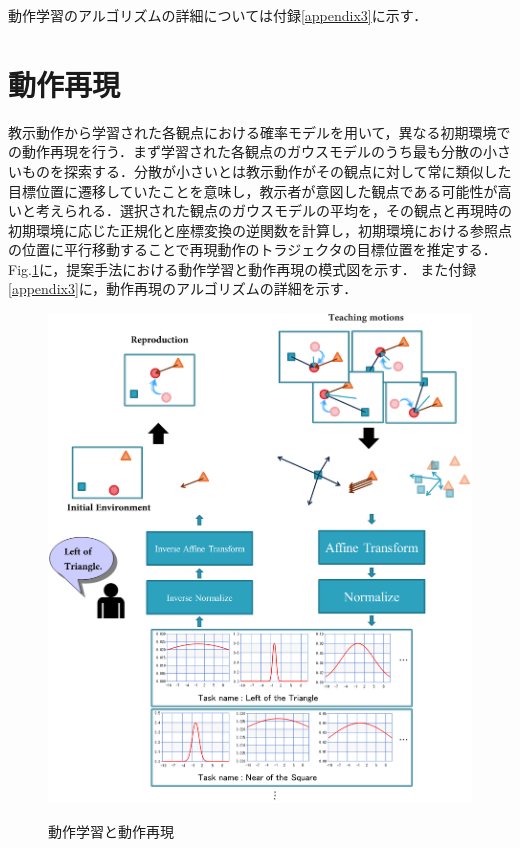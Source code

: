 動作学習のアルゴリズムの詳細については付録\ref{appendix3}に示す．


\section{動作再現}

教示動作から学習された各観点における確率モデルを用いて，異なる初期環境での動作再現を行う．まず学習された各観点のガウスモデルのうち最も分散の小さいものを探索する．分散が小さいとは教示動作がその観点に対して常に類似した目標位置に遷移していたことを意味し，教示者が意図した観点である可能性が高いと考えられる．選択された観点のガウスモデルの平均を，その観点と再現時の初期環境に応じた正規化と座標変換の逆関数を計算し，初期環境における参照点の位置に平行移動することで再現動作のトラジェクタの目標位置を推定する．
Fig.\ref{figure:learning_and_reproduction_model}に，提案手法における動作学習と動作再現の模式図を示す．
また付録\ref{appendix3}に，動作再現のアルゴリズムの詳細を示す．
	\begin{figure}[h]
		\begin{center}
			\includegraphics[width=12cm]{chart9.png} \\ %
			\caption{動作学習と動作再現}
			\label{figure:learning_and_reproduction_model}
		\end{center}
	\end{figure}

